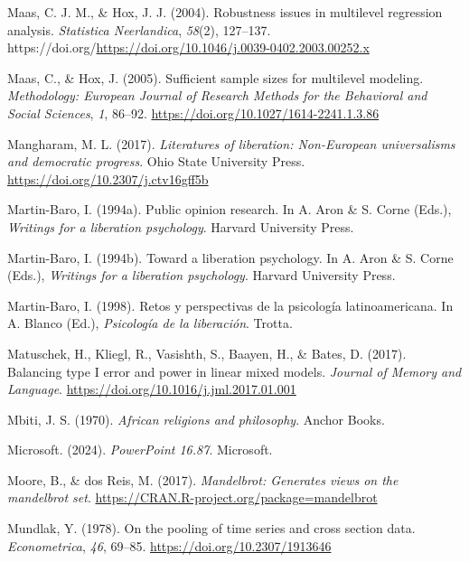 \documentclass[
  letterpaper,
  DIV=11,
  numbers=noendperiod]{scrreprt}
\newlength{\cslhangindent}
\newenvironment{CSLReferences}[2] %
 {\begin{list}{}{%
  \setlength{\itemindent}{0pt}
  \setlength{\leftmargin}{0pt}
  \setlength{\parsep}{0pt}
  \ifodd #1
   \setlength{\leftmargin}{\cslhangindent}
   \setlength{\itemindent}{-1\cslhangindent}
  \fi
  \setlength{\itemsep}{#2\baselineskip}}}
 {\end{list}}
\begin{document}
\begin{CSLReferences}{1}{0}
Maas, C. J. M., \& Hox, J. J. (2004). Robustness issues in multilevel
regression analysis. \emph{Statistica Neerlandica}, \emph{58}(2),
127--137.
https://doi.org/\url{https://doi.org/10.1046/j.0039-0402.2003.00252.x}

Maas, C., \& Hox, J. (2005). Sufficient sample sizes for multilevel
modeling. \emph{Methodology: European Journal of Research Methods for
the Behavioral and Social Sciences}, \emph{1}, 86--92.
\url{https://doi.org/10.1027/1614-2241.1.3.86}

Mangharam, M. L. (2017). \emph{Literatures of liberation: Non-{E}uropean
universalisms and democratic progress}. Ohio State University Press.
\url{https://doi.org/10.2307/j.ctv16gff5b}

Martin-Baro, I. (1994a). Public opinion research. In A. Aron \& S. Corne
(Eds.), \emph{Writings for a liberation psychology}. Harvard University
Press.

Martin-Baro, I. (1994b). Toward a liberation psychology. In A. Aron \&
S. Corne (Eds.), \emph{Writings for a liberation psychology}. Harvard
University Press.

Martin-Baro, I. (1998). {Retos y perspectivas de la psicología
latinoamericana}. In A. Blanco (Ed.), \emph{Psicología de la
liberación}. Trotta.

Matuschek, H., Kliegl, R., Vasishth, S., Baayen, H., \& Bates, D.
(2017). Balancing type {I} error and power in linear mixed models.
\emph{Journal of Memory and Language}.
\url{https://doi.org/10.1016/j.jml.2017.01.001}

Mbiti, J. S. (1970). \emph{African religions and philosophy}. Anchor
Books.

Microsoft. (2024). \emph{PowerPoint 16.87}. Microsoft.

Moore, B., \& dos Reis, M. (2017). \emph{Mandelbrot: Generates views on
the mandelbrot set}. \url{https://CRAN.R-project.org/package=mandelbrot}

Mundlak, Y. (1978). On the pooling of time series and cross section
data. \emph{Econometrica}, \emph{46}, 69--85.
\url{https://doi.org/10.2307/1913646}


\end{CSLReferences}
\end{document}
